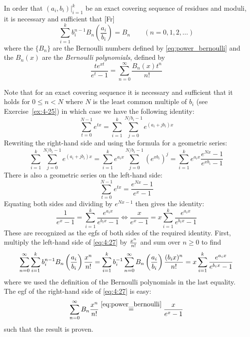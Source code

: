 \begin{exercise}
    In order that $(a_i, b_i)\rvert_{i=1}^k$ be an exact covering sequence of residues and moduli, it is necessary and sufficient that [Fr]
    \begin{equation} \label{eq:4:27}
        \sum_{i=1}^k b_i^{n-1}B_n\left(\frac{a_i}{b_i}\right) = B_n \qquad (n=0,1,2,\ldots)
    \end{equation}
    where the $\{B_n\}$ are the Bernoulli numbers defined by \eqref{eq:power_bernoulli} and the $B_n(x)$ are the \emph{Bernoulli polynomials}, defined by
    \[
        \frac{te^{xt}}{e^t-1} = \sum_{n=0}^\infty \frac{B_n(x)t^n}{n!}
    \]
\end{exercise}
\begin{solution}
    Note that for an exact covering sequence it is necessary and sufficient that it holds for $0\leq n < N$ where $N$ is the least common multiple of $b_i$ (see Exercise~\ref{ex:4-25}) in which case we have the following identity:
    \[
        \sum_{t=0}^{N-1}e^{tx} = \sum_{i=1}^k \sum_{j=0}^{N/b_i -1} e^{(a_i + jb_i)x}
    \]
    Rewriting the right-hand side and using the formula for a geometric series:
    \[
        \sum_{i=1}^k \sum_{j=0}^{N/b_i -1} e^{(a_i + jb_i)x} = \sum_{i=1}^k e^{a_i x} \sum_{j=0}^{N/b_i - 1} \left(e^{xb_i}\right)^j = \sum_{i=1}^k e^{a_i x} \frac{e^{Nx}-1}{e^{xb_i}-1}
    \]
    There is also a geometric series on the left-hand side:
    \[
        \sum_{t=0}^{N-1}e^{tx} = \frac{e^{Nx}-1}{e^x-1}
    \]
    Equating both sides and dividing by $e^{Nx-1}$ then gives the identity:
    \[
        \frac{1}{e^x - 1} = \sum_{i=1}^k \frac{e^{a_ix}}{e^{b_ix} - 1} \Longleftrightarrow  \frac{x}{e^x - 1} = x\sum_{i=1}^k \frac{e^{a_ix}}{e^{b_ix} - 1}
    \]
    These are recognized as the egfs of both sides of the required identity. First, multiply the left-hand side of \eqref{eq:4:27} by $\expcoeff$ and sum over $n\geq 0$ to find
    \[
        \bsum[n] \sum_{i=1}^k b_i^{n-1} B_n\left(\frac{a_i}{b_i}\right)\expcoeff = \sum_{i=1}^k b_i^{-1} \bsum[n] B_n\left(\frac{a_i}{b_i}\right)\frac{(b_ix)^n}{n!} 
        = x\sum_{i=1}^k \frac{e^{a_ix}}{e^{b_ix} - 1}
    \]
    where we used the definition of the Bernoulli polynomials in the last equality. The egf of the right-hand side of \eqref{eq:4:27} is easy:
    \[
        \bsum B_n \expcoeff \estep{\eqref{eq:power_bernoulli}} \frac{x}{e^x-1}
    \]
    such that the result is proven.
\end{solution}

